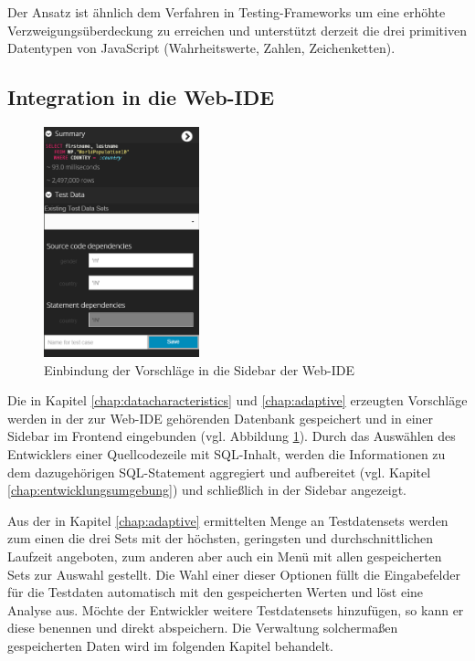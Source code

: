 Der Ansatz ist ähnlich dem Verfahren in Testing-Frameworks um eine erhöhte Verzweigungsüberdeckung zu erreichen und unterstützt derzeit die drei primitiven Datentypen von JavaScript (Wahrheitswerte, Zahlen, Zeichenketten).

\subsection{Integration in die Web-IDE}
\begin{figure}[ht]
	\centering
  \includegraphics[width=0.4\textwidth]{figures/integration.png}
	\caption{Einbindung der Vorschläge in die Sidebar der Web-IDE}
	\label{fig:ideintegration}
\end{figure}

Die in Kapitel \ref{chap:datacharacteristics} und \ref{chap:adaptive} erzeugten Vorschläge werden in der zur Web-IDE gehörenden Datenbank gespeichert und in einer Sidebar im Frontend eingebunden (vgl. Abbildung \ref{fig:ideintegration}).
Durch das Auswählen des Entwicklers einer Quellcodezeile mit SQL-Inhalt, werden die Informationen zu dem dazugehörigen SQL-Statement aggregiert und aufbereitet (vgl. Kapitel \ref{chap:entwicklungsumgebung}) und schließlich in der Sidebar angezeigt.

Aus der in Kapitel \ref{chap:adaptive} ermittelten Menge an Testdatensets werden zum einen die drei Sets mit der höchsten, geringsten und durchschnittlichen Laufzeit angeboten, zum anderen aber auch ein Menü mit allen gespeicherten Sets zur Auswahl gestellt.
Die Wahl einer dieser Optionen füllt die Eingabefelder für die Testdaten automatisch mit den gespeicherten Werten und löst eine Analyse aus.
Möchte der Entwickler weitere Testdatensets hinzufügen, so kann er diese benennen und direkt abspeichern.
Die Verwaltung solchermaßen gespeicherten Daten wird im folgenden Kapitel behandelt.
